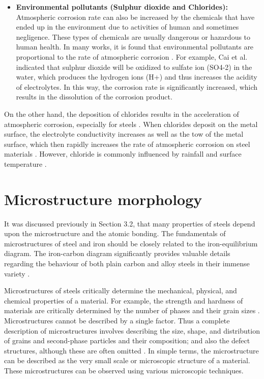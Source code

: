 \begin{itemize}
    \item \textbf{Environmental pollutants (Sulphur dioxide and Chlorides):} Atmospheric corrosion rate can also be increased by the chemicals that have ended up in the environment due to activities of human and sometimes negligence. These types of chemicals are usually dangerous or hazardous to human health. In many works, it is found that environmental pollutants are proportional to the rate of atmospheric corrosion \cite{soler2000metallic, dong2005deformation, islam2018effects}. For example, Cai et al. \cite{cai2018influence} indicated that sulphur dioxide will be oxidized to sulfate ion (SO4-2) in the water, which produces the hydrogen ions (H+) and thus increases the acidity of electrolytes. In this way, the corrosion rate is significantly increased, which results in the dissolution of the corrosion product.
\end{itemize}
    
On the other hand, the deposition of chlorides results in the acceleration of atmospheric corrosion, especially for steels \cite{islam2018effects}. When chlorides deposit on the metal surface, the electrolyte conductivity increases as well as the \acrshort{tow} of the metal surface, which then rapidly increases the rate of atmospheric corrosion on steel materials \cite{marzorati2018green}. However, chloride is commonly influenced by rainfall and surface temperature \cite{cai2018influence}.

\section{Microstructure morphology}
\label{ch3:anchor:section:morphology}
It was discussed previously in Section 3.2, that many properties of steels depend upon the microstructure and the atomic bonding. The fundamentals of microstructures of steel and iron should be closely related to the iron-equilibrium diagram. The iron-carbon diagram significantly provides valuable details regarding the behaviour of both plain carbon and alloy steels in their immense variety \cite{bhadeshia2017steels}.

Microstructures of steels critically determine the mechanical, physical, and chemical properties of a material. For example, the strength and hardness of materials are critically determined by the number of phases and their grain sizes \cite{clemens2017microstructure}. Microstructures cannot be described by a single factor. Thus a complete description of microstructures involves describing the size, shape, and distribution of grains and second-phase particles and their composition; and also the defect structures, although these are often omitted \cite{suryanarayana2017microstructure}. In simple terms, the microstructure can be described as the very small scale or microscopic structure of a material. These microstructures can be observed using various microscopic techniques.  

